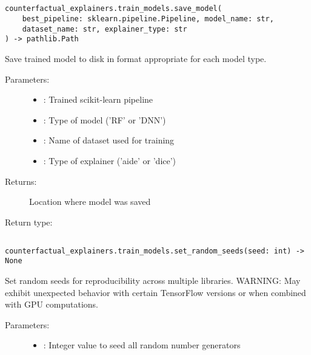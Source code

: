 \subsection{}
\label{func:save_model}

\begin{lstlisting}
counterfactual_explainers.train_models.save_model(
    best_pipeline: sklearn.pipeline.Pipeline, model_name: str,
    dataset_name: str, explainer_type: str
) -> pathlib.Path
\end{lstlisting}

Save trained model to disk in format appropriate for each model type.

\begin{description}
    \item[Parameters:]
        \begin{itemize}
            \item {}: Trained scikit-learn pipeline
            \item {}: Type of model ('RF' or 'DNN')
            \item {}: Name of dataset used for training
            \item {}: Type of explainer ('aide' or 'dice')
        \end{itemize}
    \item[Returns:] Location where model was saved
    \item[Return type:] 
\end{description}

\subsection{}
\label{func:set_random_seeds}

\begin{lstlisting}
counterfactual_explainers.train_models.set_random_seeds(seed: int) -> None
\end{lstlisting}

Set random seeds for reproducibility across multiple libraries.
WARNING: May exhibit unexpected behavior with certain TensorFlow versions or when combined with GPU computations.

\begin{description}
    \item[Parameters:]
        \begin{itemize}
            \item {}: Integer value to seed all random number generators
        \end{itemize}
\end{description}

